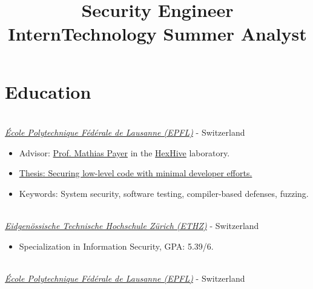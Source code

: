 \documentclass[mm, 11pt]{simple_style}
\begin{document}
\begin{resume}
\begin{position}
    \title{Security Engineer Intern}
\end{position}
\begin{position}
    \title{Technology Summer Analyst}
\end{position}
\vspace{-\parskip}
\sectionline
\section{Education}

\\
\textsl{\href{https://ic.epfl.ch/en}{\'Ecole Polytechnique F\'ed\'erale de Lausanne (EPFL)}} - Switzerland
\begin{itemize}
  \item Advisor: \href{https://nebelwelt.net/}{Prof. Mathias Payer} in the \href{https://hexhive.epfl.ch}{HexHive} laboratory.
  \item \href{https://infoscience.epfl.ch/entities/publication/5c91711a-5bf2-4fe0-b04e-830ac3a13bfb}{Thesis: Securing low-level code with minimal developer efforts.}
  \item Keywords: System security, software testing, compiler-based defenses, fuzzing. 
\end{itemize}


\\
\textsl{\href{https://www.inf.ethz.ch/}{Eidgen\"ossische Technische Hochschule Z\"urich (ETHZ)}} - Switzerland

\begin{itemize}
  \item  Specialization in Information Security, GPA: 5.39/6.
\end{itemize}
\\
\textsl{\href{https://ic.epfl.ch/en}{\'Ecole Polytechnique F\'ed\'erale de Lausanne (EPFL)}} - Switzerland


\end{resume}
\end{document}
